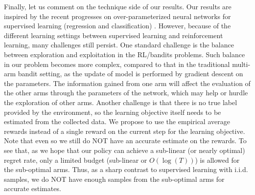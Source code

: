 Finally, let us comment on the technique side of our results. 
Our results are inspired by the recent progresses on over-parameterized neural networks for supervised learning (regression and classification) \citep{li2018learning,du2018gradientA,du2018gradientB,allen2018convergenceA,allen2018convergenceB}. 
However, because of the different learning settings between supervised learning and reinforcement learning, many challenges still persist. 
One standard challenge is the balance between exploration and exploitation in the RL/bandits problems.
Such balance in our problem becomes more complex, compared to that in the traditional multi-arm bandit setting, as the update of model is performed by gradient descent on the parameters.
The information gained from one arm will affect the evaluation of the other arms through the parameters of the network, which may help or hurdle the exploration of other arms.
Another challenge is that there is no true label provided by the environment, so the learning objective itself needs to be estimated from the collected data.
We propose to use the empirical average rewards instead of a single reward on the current step for the learning objective. 
Note that even so we still do NOT have an accurate estimate on the rewards.
To see that, as we hope that our policy can achieve a sub-linear (or nearly optimal) regret rate, only a limited budget (sub-linear or $O(\log(T))$) is allowed for the sub-optimal arms. Thus, as a sharp contrast to supervised learning with i.i.d. samples, we do NOT have enough samples from the sub-optimal arms for accurate estimates.  



